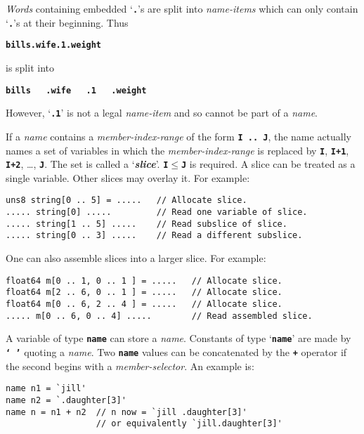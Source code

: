 \documentclass[12pt]{article}
\makeatletter
\newcommand{\TT}[1]{{\tt \bfseries #1}}
\newcommand{\key}[1]{{\bf \em #1}\index{#1}}
\newcommand{\ttkey}[1]{\TT{#1}\index{#1@{\tt #1}}}
\newenvironment{indpar}[1][0.3in]%
	{\begin{list}{}%
		     {\setlength{\itemsep}{0in}%
		      \setlength{\topsep}{0in}%
		      \setlength{\parsep}{1ex}%
		      \setlength{\labelwidth}{#1}%
		      \setlength{\leftmargin}{#1}%
		      \addtolength{\leftmargin}{\labelsep}}%
	 \item}%
	{\end{list}}
\makeatother
\begin{document}
{\em Words} containing embedded `\TT{.}'s are split into
{\em name-items} which can only contain `\TT{.}'s at their beginning.
Thus
\begin{center}
\TT{bills.wife.1.weight}
\end{center}
is split into
\begin{center}
\TT{bills~~~.wife~~~.1~~~.weight}
\end{center}
However, `\TT{.1}' is not a legal {\em name-item} and so cannot
be part of a {\em name}.

If a {\em name} contains a {\em member-index-range} of the form
\TT{I~..~J}, the name actually names a set of variables in which
the {\em member-index-range} is replaced by \TT{I}, \TT{I+1},
\TT{I+2}, \ldots, \TT{J}.  The set is called a `\key{slice}'.\label{SLICE}
\TT{I}$\leq$\TT{J} is required.
A slice can be treated as a single variable.  Other slices may
overlay it.  For example:
\begin{indpar}\begin{verbatim}
uns8 string[0 .. 5] = .....   // Allocate slice.
..... string[0] .....         // Read one variable of slice.
..... string[1 .. 5] .....    // Read subslice of slice.
..... string[0 .. 3] .....    // Read a different subslice.
\end{verbatim}\end{indpar}

One can also assemble slices into a larger slice.  For example:
\begin{indpar}\begin{verbatim}
float64 m[0 .. 1, 0 .. 1 ] = .....   // Allocate slice.
float64 m[2 .. 6, 0 .. 1 ] = .....   // Allocate slice.
float64 m[0 .. 6, 2 .. 4 ] = .....   // Allocate slice.
..... m[0 .. 6, 0 .. 4] .....        // Read assembled slice.
\end{verbatim}\end{indpar}

A variable of type \ttkey{name} can store a {\em name}.
Constants of type `\TT{name}' are made by \TT{`~'} quoting a {\em name}.
Two \TT{name} values can be
concatenated by the \TT{+} operator if the second begins with
a {\em member-selector}.  An
example is:
\begin{indpar}\begin{verbatim}
name n1 = `jill'
name n2 = `.daughter[3]'
name n = n1 + n2  // n now = `jill .daughter[3]'
                  // or equivalently `jill.daughter[3]'
\end{verbatim}\end{indpar}
\end{document}
